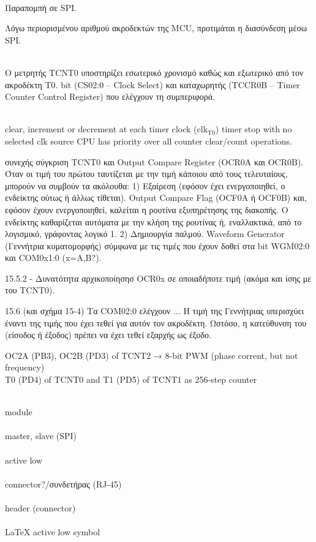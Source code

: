 ~\\\nref{} Παραπομπή σε SPI.

Λόγω περιορισμένου αριθμού ακροδεκτών της MCU, προτιμάται η διασύνδεση μέσω SPI.


\parencite[95]{atmel13}\\
Ο μετρητής TCNT0 υποστηρίζει εσωτερικό χρονισμό καθώς και εξωτερικό από τον
ακροδέκτη T0. bit (CS02:0 -- Clock Select) και καταχωρητής (TCCR0B -- Timer
Counter Control Register) που ελέγχουν τη συμπεριφορά.

\parencite[96]{atmel13}\\
clear, increment or decrement at each timer clock (clk$_{\text{T0}}$)
timer stop with no selected clk source
CPU has priority over all counter clear/count operations.

συνεχής σύγκριση TCNT0 και Output Compare Register (OCR0A και OCR0B).
Όταν οι τιμή του πρώτου ταυτίζεται με την τιμή κάποιου από τους τελευταίους,
μπορούν να συμβούν τα ακόλουθα:
1) Εξαίρεση (εφόσον έχει ενεργοποιηθεί, ο ενδείκτης ούτως ή άλλως τίθεται).
 Output Compare Flag (OCF0A ή OCF0B) και, εφόσον έχουν ενεργοποιηθεί, καλείται
η ρουτίνα εξυπηρέτησης της διακοπής. Ο ενδείκτης καθαρίζεται αυτόματα με την
κλήση της ρουτίνας ή, εναλλακτικά, από το λογισμικό, γράφοντας λογικό 1.
2) Δημιουργία παλμού. Waveform Generator (Γεννήτρια κυματομορφής) σύμφωνα με τις
τιμές που έχουν δοθεί στα bit WGM02:0 και COM0x1:0 (x={A,B}?).

15.5.2 - Δυνατότητα αρχικοποίησησ OCR0x σε οποιαδήποτε τιμή (ακόμα και ίσης με
του TCNT0).


15.6 (και σχήμα 15-4) Τα COM02:0 ελέγχουν ...
Η τιμή της Γεννήτριας υπερισχύει έναντι της τιμής που έχει τεθεί για αυτόν τον
ακροδέκτη. Ωστόσο, η κατεύθυνση του (είσοδος ή έξοδος) πρέπει να έχει τεθεί
εξαρχής ως έξοδο.

\begin{flushleft}
OC2A (PB3), OC2B (PD3) of TCNT2 → 8-bit PWM (phase corrent, but not frequency)\\
T0 (PD4) of TCNT0 and T1 (PD5) of TCNT1 as 256-step counter
\end{flushleft}

~\\module\\
~\\master, slave (SPI)\\
~\\active low\\
~\\connector?/συνδετήρας (RJ-45)\\
~\\header (connector)\\
~\\LaTeX active low symbol\\


